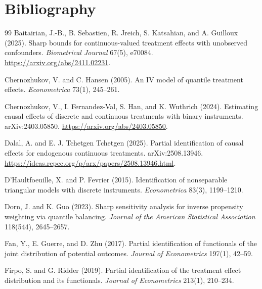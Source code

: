 \documentclass[11pt]{article}
\theoremstyle{definition}
\theoremstyle{plain}
\theoremstyle{remark}
\begin{document}
\section*{Bibliography}
\begin{thebibliography}{99}
Baitairian, J.-B., B. Sebastien, R. Jreich, S. Katsahian, and A. Guilloux (2025).
\newblock Sharp bounds for continuous-valued treatment effects with unobserved confounders.
\newblock \emph{Biometrical Journal} 67(5), e70084. \url{https://arxiv.org/abs/2411.02231}.

Chernozhukov, V. and C. Hansen (2005).
\newblock An IV model of quantile treatment effects.
\newblock \emph{Econometrica} 73(1), 245--261.

Chernozhukov, V., I. Fernandez-Val, S. Han, and K. Wuthrich (2024).
\newblock Estimating causal effects of discrete and continuous treatments with binary instruments.
\newblock arXiv:2403.05850. \url{https://arxiv.org/abs/2403.05850}.

Dalal, A. and E. J. Tchetgen Tchetgen (2025).
\newblock Partial identification of causal effects for endogenous continuous treatments.
\newblock arXiv:2508.13946. \url{https://ideas.repec.org/p/arx/papers/2508.13946.html}.

D'Haultfoeuille, X. and P. Fevrier (2015).
\newblock Identification of nonseparable triangular models with discrete instruments.
\newblock \emph{Econometrica} 83(3), 1199--1210.

Dorn, J. and K. Guo (2023).
\newblock Sharp sensitivity analysis for inverse propensity weighting via quantile balancing.
\newblock \emph{Journal of the American Statistical Association} 118(544), 2645--2657.

Fan, Y., E. Guerre, and D. Zhu (2017).
\newblock Partial identification of functionals of the joint distribution of potential outcomes.
\newblock \emph{Journal of Econometrics} 197(1), 42--59.

Firpo, S. and G. Ridder (2019).
\newblock Partial identification of the treatment effect distribution and its functionals.
\newblock \emph{Journal of Econometrics} 213(1), 210--234.


\end{thebibliography}
\end{document}
